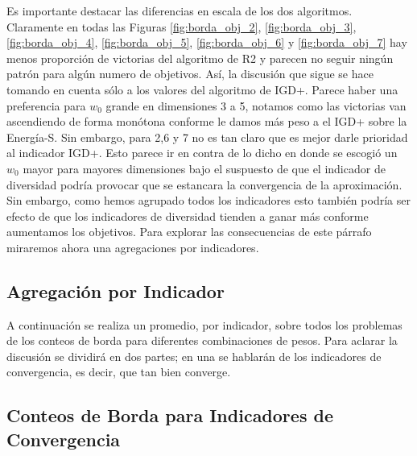Es importante destacar las diferencias en escala de los dos algoritmos. Claramente en todas las Figuras \ref{fig:borda_obj_2}, \ref{fig:borda_obj_3}, \ref{fig:borda_obj_4}, \ref{fig:borda_obj_5}, \ref{fig:borda_obj_6} y  \ref{fig:borda_obj_7} hay menos proporción de victorias del algoritmo de R2 y parecen no seguir ningún patrón para algún numero de objetivos. Así, la discusión que sigue se hace tomando en cuenta sólo a los valores del algoritmo de IGD+. 
Parece haber una preferencia para $w_0$ grande en dimensiones 3 a 5, notamos como las victorias van ascendiendo de forma monótona conforme le damos más peso a el IGD+ sobre la Energía-S. Sin embargo, para 2,6 y 7 no es tan claro que es mejor darle prioridad al indicador IGD+. Esto parece ir en contra de lo dicho en \cite{PFI} donde se escogió un $w_0$ mayor para mayores dimensiones bajo el suspuesto de que el indicador de diversidad podría provocar que se estancara la convergencia de la aproximación. Sin embargo, como hemos agrupado todos los indicadores esto también podría ser efecto de que los indicadores de diversidad tienden a ganar más conforme aumentamos los objetivos. Para explorar las consecuencias de este párrafo miraremos ahora una agregaciones por indicadores.

\subsection{Agregación por Indicador}

A continuación se realiza un promedio, por indicador, sobre todos los problemas de los conteos de borda para diferentes combinaciones de pesos. Para aclarar la discusión se dividirá en dos partes; en una se hablarán de los indicadores de convergencia, es decir, que tan bien converge. 



\subsection*{Conteos de Borda para Indicadores de Convergencia}

